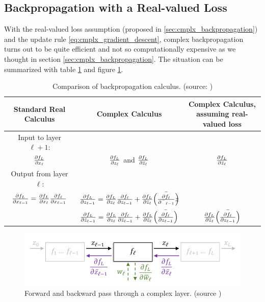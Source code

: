 \documentclass[../main.tex]{subfiles}
\begin{document}
\subsection{Backpropagation with a Real-valued Loss}

With the real-valued loss assumption (proposed in \ref{sec:cmplx_backpropagation}) and the update rule \ref{eq:cmplx_gradient_descent}, complex backpropagation turns out to be quite efficient and not so computationally expensive as we thought in section \ref{sec:cmplx_backpropagation}. The situation can be summarized with table \ref{tab:comparison_backpropagation} and figure \ref{fig:visual_cmplx_backpropagation}.

\begin{table}[!ht]
	\centering
	\begin{tabular}{c c c}
		\toprule
		\textbf{Standard Real Calculus} & \textbf{Complex Calculus} & \textbf{Complex Calculus, assuming real-valued loss}\\
		\midrule
		Input to layer $\ell +1$:\\
		$\pdv{f_L}{x_\ell}$ & $\pdv{f_L}{z_\ell}$ and $\pdv{f_L}{\bar{z}_\ell}$ & $\pdv{f_L}{\bar{z}_\ell}$\\
		\midrule
		Output from layer $\ell$:\\
		$\pdv{f_L}{x_{\ell-1}} = \pdv{f_L}{x_\ell}\pdv{f_\ell}{x_{\ell-1}}$ & $\pdv{f_L}{z_{\ell-1}} = \pdv{f_L}{z_\ell}\pdv{f_\ell}{z_{\ell-1}} + \pdv{f_L}{\bar{z}_\ell}\bar{\left(\pdv{f_\ell}{\bar{z}_{\ell-1}}\right)}$\\
		& $\pdv{f_L}{\bar{z}_{\ell-1}} = \pdv{f_L}{z_\ell}\pdv{f_\ell}{\bar{z}_{\ell-1}} + \pdv{f_L}{\bar{z}_\ell}\bar{\left(\pdv{f_\ell}{z_{\ell-1}}\right)}$ & $\pdv{f_L}{\bar{z}_\ell}\bar{\left(\pdv{f_\ell}{z_{\ell-1}}\right)}$ \\
		\bottomrule
	\end{tabular}
	\caption{Comparison of backpropagation calculus. (source: \cite{Virtue:EECS-2019-126})}
	\label{tab:comparison_backpropagation}
\end{table}

\begin{figure}[!ht]
	\centering
	\includegraphics[scale=1.]{pictures/pass_cmplx_layer}
	\caption{Forward and backward pass through a complex layer. (source \cite{Virtue:EECS-2019-126})}
	\label{fig:visual_cmplx_backpropagation}
\end{figure}
\end{document}
